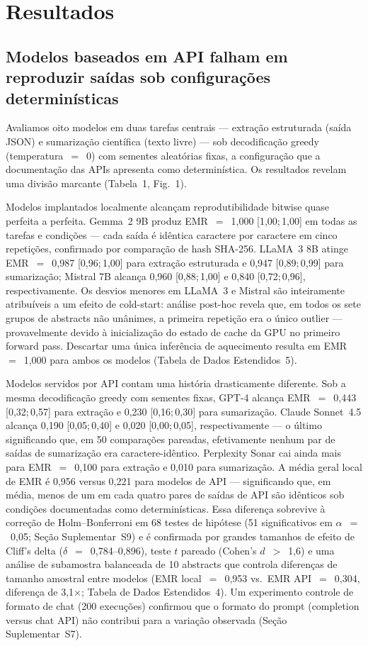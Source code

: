 \documentclass[12pt,a4paper]{article}
\begin{document}
\section*{Resultados}

\subsection*{Modelos baseados em API falham em reproduzir saídas sob configurações determinísticas}

Avaliamos oito modelos em duas tarefas centrais --- extração estruturada (saída JSON) e sumarização científica (texto livre) --- sob decodificação greedy (temperatura~$=$~0) com sementes aleatórias fixas, a configuração que a documentação das APIs apresenta como determinística.
Os resultados revelam uma divisão marcante (Tabela~1, Fig.~1).

Modelos implantados localmente alcançam reprodutibilidade bitwise quase perfeita a perfeita.
Gemma~2 9B produz EMR~$=$~1,000 [1,00;\,1,00] em todas as tarefas e condições --- cada saída é idêntica caractere por caractere em cinco repetições, confirmado por comparação de hash SHA-256.
LLaMA~3 8B atinge EMR~$=$~0,987 [0,96;\,1,00] para extração estruturada e 0,947 [0,89;\,0,99] para sumarização; Mistral 7B alcança 0,960 [0,88;\,1,00] e 0,840 [0,72;\,0,96], respectivamente.
Os desvios menores em LLaMA~3 e Mistral são inteiramente atribuíveis a um efeito de cold-start: análise post-hoc revela que, em todos os sete grupos de abstracts não unânimes, a primeira repetição era o único outlier --- provavelmente devido à inicialização do estado de cache da GPU no primeiro forward pass.
Descartar uma única inferência de aquecimento resulta em EMR~$=$~1,000 para ambos os modelos (Tabela de Dados Estendidos~5).

Modelos servidos por API contam uma história drasticamente diferente.
Sob a mesma decodificação greedy com sementes fixas, GPT-4 alcança EMR~$=$~0,443 [0,32;\,0,57] para extração e 0,230 [0,16;\,0,30] para sumarização.
Claude Sonnet~4.5 alcança 0,190 [0,05;\,0,40] e 0,020 [0,00;\,0,05], respectivamente --- o último significando que, em 50 comparações pareadas, efetivamente nenhum par de saídas de sumarização era caractere-idêntico.
Perplexity Sonar cai ainda mais para EMR~$=$~0,100 para extração e 0,010 para sumarização.
A média geral local de EMR é 0,956 versus 0,221 para modelos de API --- significando que, em média, menos de um em cada quatro pares de saídas de API são idênticos sob condições documentadas como determinísticas.
Essa diferença sobrevive à correção de Holm--Bonferroni em 68 testes de hipótese (51 significativos em $\alpha$~$=$~0,05; Seção Suplementar~S9) e é confirmada por grandes tamanhos de efeito de Cliff's delta ($\delta$~$=$~0,784--0,896), teste $t$ pareado (Cohen's $d$~$>$~1,6) e uma análise de subamostra balanceada de 10 abstracts que controla diferenças de tamanho amostral entre modelos (EMR local~$=$~0,953 vs.\ EMR API~$=$~0,304, diferença de 3,1$\times$; Tabela de Dados Estendidos~4).
Um experimento controle de formato de chat (200 execuções) confirmou que o formato do prompt (completion versus chat API) não contribui para a variação observada (Seção Suplementar~S7).
\end{document}

